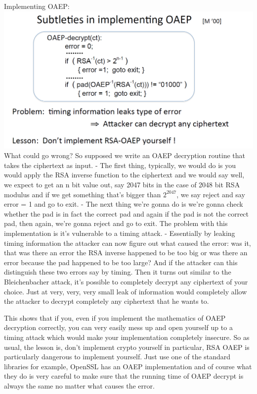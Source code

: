 \documentclass[11pt]{article}
\makeatletter
\def\maxwidth{\ifdim\Gin@nat@width>\linewidth\linewidth
    \else\Gin@nat@width\fi}
\let\Oldincludegraphics\includegraphics
\renewcommand{\includegraphics}[1]{\Oldincludegraphics[width=.8\maxwidth]{#1}}
\makeatother
\begin{document}
Implementing OAEP:
\includegraphics{./Images/OAEPSubtle-Implementation.png} What could go
wrong? So supposed we write an OAEP decryption routine that takes the
ciphertext as input. - The first thing, typically, we would do is you
would apply the RSA inverse function to the ciphertext and we would say
well, we expect to get an n bit value out, say 2047 bits in the case of
2048 bit RSA modulus and if we get something that's bigger than
\(2^{2047}\), we say reject and say error = 1 and go to exit. - The next
thing we're gonna do is we're gonna check whether the pad is in fact the
correct pad and again if the pad is not the correct pad, then again,
we're gonna reject and go to exit. The problem with this implementation
is it's vulnerable to a timing attack. - Essentially by leaking timing
information the attacker can now figure out what caused the error: was
it, that was there an error the RSA inverse happened to be too big or
was there an error because the pad happened to be too large? And if the
attacker can this distinguish these two errors say by timing. Then it
turns out similar to the Bleichenbacher attack, it's possible to
completely decrypt any ciphertext of your choice. Just at very, very,
very small leak of information would completely allow the attacker to
decrypt completely any ciphertext that he wants to.

This shows that if you, even if you implement the mathematics of OAEP
decryption correctly, you can very easily mess up and open yourself up
to a timing attack which would make your implementation completely
insecure. So as usual, the lesson is, don't implement crypto yourself in
particular, RSA OAEP is particularly dangerous to implement yourself.
Just use one of the standard libraries for example, OpenSSL has an OAEP
implementation and of course what they do is very careful to make sure
that the running time of OAEP decrypt is always the same no matter what
causes the error.
\end{document}
